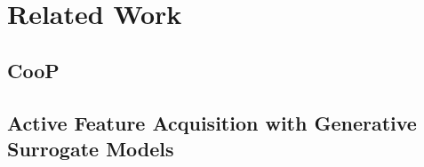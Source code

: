 \documentclass[../main.tex]{subfiles}
\begin{document}
\chapter{Related Work}

\section{CooP}
\section{Active Feature Acquisition with Generative Surrogate Models}
\end{document}
